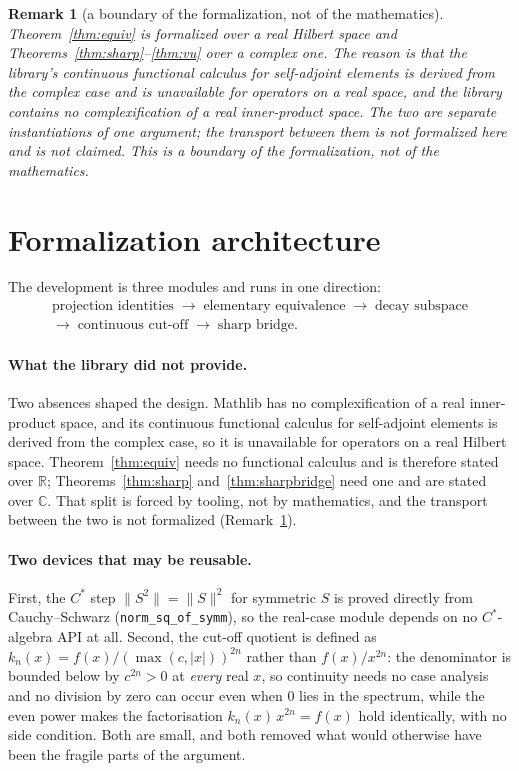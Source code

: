 \documentclass[11pt]{article}
\newtheorem{remark}[theorem]{Remark}
\theoremstyle{definition}
\newcommand{\lean}[1]{\texttt{#1}}
\newcommand{\R}{\mathbb{R}}
\newcommand{\C}{\mathbb{C}}
\begin{document}
\begin{remark}[a boundary of the formalization, not of the mathematics]
\label{rem:RC}
Theorem~\ref{thm:equiv} is formalized over a real Hilbert space and
Theorems~\ref{thm:sharp}--\ref{thm:vu} over a complex one.  The reason is
that the library's continuous functional calculus for self-adjoint
elements is derived from the complex case and is unavailable for
operators on a real space, and the library contains no complexification
of a real inner-product space.  The two are separate instantiations of
one argument; the transport between them is not formalized here and is
not claimed.  This is a boundary of the formalization, not of the
mathematics.
\end{remark}

\section{Formalization architecture}
\label{sec:arch}

The development is three modules and runs in one direction:
\begin{gather*}
\text{projection identities}
\;\to\;
\text{elementary equivalence}
\;\to\;
\text{decay subspace}\\
\to\;
\text{continuous cut-off}
\;\to\;
\text{sharp bridge.}
\end{gather*}

\paragraph{What the library did not provide.}  Two absences shaped the
design.  Mathlib has no complexification of a real inner-product space,
and its continuous functional calculus for self-adjoint elements is
derived from the complex case, so it is unavailable for operators on a
real Hilbert space.  Theorem~\ref{thm:equiv} needs no functional
calculus and is therefore stated over $\R$; Theorems~\ref{thm:sharp}
and~\ref{thm:sharpbridge} need one and are stated over $\C$.  That split
is forced by tooling, not by mathematics, and the transport between the
two is not formalized (Remark~\ref{rem:RC}).

\paragraph{Two devices that may be reusable.}  First, the $C^*$ step
$\|S^2\| = \|S\|^2$ for symmetric $S$ is proved directly from
Cauchy--Schwarz (\lean{norm\_sq\_of\_symm}), so the real-case module
depends on no $C^*$-algebra API at all.  Second, the cut-off quotient is
defined as
$k_n(x) = f(x)/(\max(c,|x|))^{2n}$ rather than $f(x)/x^{2n}$: the
denominator is bounded below by $c^{2n} > 0$ at \emph{every} real $x$, so
continuity needs no case analysis and no division by zero can occur even
when $0$ lies in the spectrum, while the even power makes the
factorisation $k_n(x)\,x^{2n} = f(x)$ hold identically, with no side
condition.  Both are small, and both removed what would otherwise have
been the fragile parts of the argument.
\end{document}
